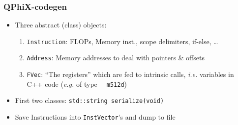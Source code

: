 \documentclass{beamer}
\begin{document}
\begin{frame}
\begin{columns}[T]
\begin{column}{.5\textwidth}
\begin{center}
        \end{center}
      \end{column}
    \end{columns}

  \end{frame}


  \begin{frame}[fragile]
    \frametitle{QPhiX-codegen}

    \begin{itemize}
      \item Three abstract (class) objects:
        \begin{enumerate}
          \item \texttt{Instruction}: FLOPs, Memory inst., scope delimiters, if-else, \dots
          \item \texttt{Address}: Memory addresses to deal with pointers \& offsets
          \item \texttt{FVec}: ``The registers'' which are fed to intrinsic calls, \textit{i.e.}
            variables in C++ code (\textit{e.g.} of type \texttt{\_\_m512d})
        \end{enumerate}

      \item First two classes: \;\; \texttt{std::string serialize(void)}
      \item Save Instructions into \texttt{InstVector}'s and dump to file
    \end{itemize}

    \tiny
\end{frame}

\end{document}
